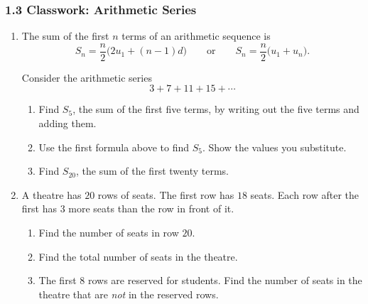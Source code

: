 \documentclass[12pt, twoside]{article}
\begin{document}
\subsubsection*{1.3 Classwork: Arithmetic Series}

\begin{enumerate}[itemsep=0.15cm]

\item[1.]

The sum of the first $n$ terms of an arithmetic sequence is
$$S_{n} = \frac{n}{2}\bigl(2u_{1} + (n - 1)d\bigr)
\qquad \text{or} \qquad
S_{n} = \frac{n}{2}\bigl(u_{1} + u_{n}\bigr).$$

Consider the arithmetic series
$$3 + 7 + 11 + 15 + \cdots$$

\begin{enumerate}[itemsep=0.1cm]
  \item Find $S_{5}$, the sum of the first five terms, by writing out
  the five terms and adding them.
  \item Use the first formula above to find $S_{5}$. Show the values
  you substitute.
  \item Find $S_{20}$, the sum of the first twenty terms.
\end{enumerate}


\newpage

\item[2.]

A theatre has $20$ rows of seats. The first row has $18$ seats. Each
row after the first has $3$ more seats than the row in front of it.

\begin{enumerate}[itemsep=0.1cm]
  \item Find the number of seats in row $20$.
  \item Find the total number of seats in the theatre.
  \item The first $8$ rows are reserved for students. Find the number
  of seats in the theatre that are \emph{not} in the reserved rows.
\end{enumerate}


\end{enumerate}
\end{document}

